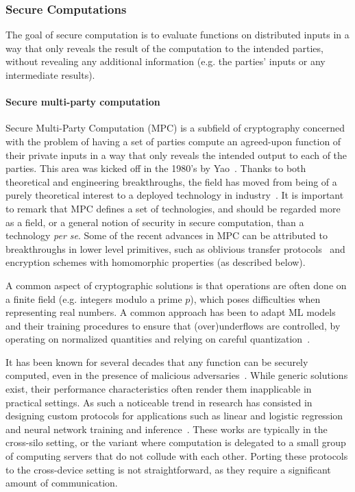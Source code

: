 \subsubsection{Secure Computations}
\label{sssec:secure_computations}

The goal of secure computation is to evaluate functions on distributed inputs in a way that only reveals the result of the computation to the intended parties, without revealing any additional information (e.g. the parties' inputs or any intermediate results). 

\paragraph{Secure multi-party computation}

Secure Multi-Party Computation (MPC) is a subfield of cryptography concerned with the problem of having a set of parties compute an agreed-upon function of their private inputs in a way that only reveals the intended output to each of the parties. This area was kicked off in the 1980’s by Yao~\cite{DBLP:conf/focs/Yao86}.  Thanks to both theoretical and engineering breakthroughs, the field has moved from being of a purely theoretical interest to a deployed technology in industry~\cite{DBLP:conf/fc/BogetoftCDGJKNNNPST09,DBLP:conf/fc/BogdanovTW12,DBLP:conf/secdev/LapetsVBJV16,araki2016high,DBLP:conf/eurocrypt/FurukawaLNW17,DBLP:journals/iacr/IonKNPSSSY17,DBLP:journals/iacr/IonKNPRSSSY19}. It is important to remark that MPC defines a set of technologies, and should be regarded more as a field, or a general notion of security in secure computation, than a technology \textit{per se}. Some of the recent advances in MPC can be attributed to breakthroughs in lower level primitives, such as oblivious transfer protocols~\cite{IKNP} and encryption schemes with homomorphic properties (as described below). 

A common aspect of cryptographic solutions is that operations are often done on a finite field (e.g. integers modulo a prime $p$), which poses difficulties when representing real numbers. A common approach has been to adapt ML models and their training procedures to ensure that (over)underflows are controlled, by operating on normalized quantities and relying on careful quantization~\cite{GasconSB0DZE17, quotient, gbdllnwCN, DBLP:conf/crypto/BourseMMP18}.

It has been known for several decades that any function can be securely computed, even in the presence of malicious adversaries~\cite{goldreich87}.
While generic solutions exist, their performance characteristics often render them inapplicable in practical settings.  As such a noticeable trend in research has consisted in designing custom protocols for applications such as linear and logistic regression~\cite{DBLP:conf/sp/NikolaenkoWIJBT13,GasconSB0DZE17, secureml} and neural network training and inference~\cite{secureml, quotient, bedkSE}. These works are typically in the cross-silo setting, or the variant where computation is delegated to a small group of computing servers that do not collude with each other. Porting these protocols to the cross-device setting is not straightforward, as they require a significant amount of communication.

